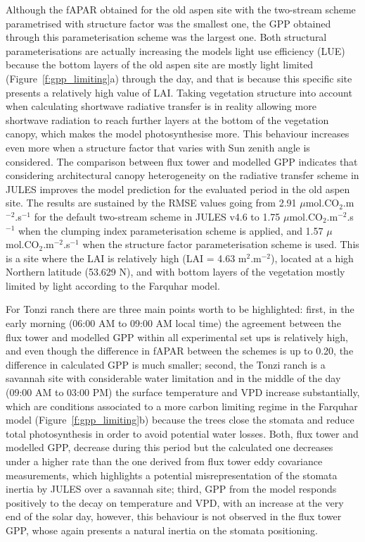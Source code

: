 \documentclass[a4paper,11pt]{report}
\begin{document}
Although the fAPAR obtained for the old aspen site with the two-stream scheme parametrised with structure factor was the smallest one, the GPP obtained through this parameterisation scheme was the largest one. Both structural parameterisations are actually increasing the model\textquotesingle s light use efficiency (LUE) because the bottom layers of the old aspen site are mostly light limited (Figure~\ref{f:gpp_limiting}a) through the day, and that is because this specific site presents a relatively high value of LAI. Taking vegetation structure into account when calculating shortwave radiative transfer is in reality allowing more shortwave radiation to reach further layers at the bottom of the vegetation canopy, which makes the model photosynthesise more. This behaviour increases even more when a structure factor that varies with Sun zenith angle is considered. The comparison between flux tower and modelled GPP indicates that considering architectural canopy heterogeneity on the radiative transfer scheme in JULES improves the model prediction for the evaluated period in the old aspen site. The results are sustained by the RMSE values going from 2.91 $\mu$mol.CO$_2$.m$^{-2}$.s$^{-1}$ for the default two-stream scheme in JULES v4.6 to 1.75 $\mu$mol.CO$_2$.m$^{-2}$.s$^{-1}$ when the clumping index parameterisation scheme is applied, and 1.57 $\mu$mol.CO$_2$.m$^{-2}$.s$^{-1}$ when the structure factor parameterisation scheme is used. This is a site where the LAI is relatively high (LAI = 4.63 m$^2$.m$^{-2}$), located at a high Northern latitude (53.629 N), and with bottom layers of the vegetation mostly limited by light according to the Farquhar model.

For Tonzi ranch there are three main points worth to be highlighted: first, in the early morning (06:00 AM to 09:00 AM local time) the agreement between the flux tower and modelled GPP within all experimental set ups is relatively high, and even though the difference in fAPAR between the schemes is up to 0.20, the difference in calculated GPP is much smaller; second, the Tonzi ranch is a savannah site with considerable water limitation and in the middle of the day (09:00 AM to 03:00 PM) the surface temperature and VPD increase substantially, which are conditions associated to a more carbon limiting regime in the Farquhar model (Figure~\ref{f:gpp_limiting}b) because the trees close the stomata and reduce total photosynthesis in order to avoid potential water losses. Both, flux tower and modelled GPP, decrease during this period but the calculated one decreases under a higher rate than the one derived from flux tower eddy covariance measurements, which highlights a potential misrepresentation of the stomata inertia by JULES over a savannah site; third, GPP from the model responds positively to the decay on temperature and VPD, with an increase at the very end of the solar day, however, this behaviour is not observed in the flux tower GPP, whose again presents a natural inertia on the stomata positioning.
\end{document}
